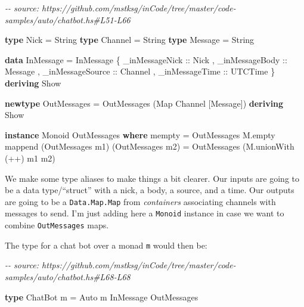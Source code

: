 \documentclass[]{article}
\newenvironment{Shaded}{}{}
\newcommand{\CommentTok}[1]{\textcolor[rgb]{0.38,0.63,0.69}{\textit{#1}}}
\newcommand{\DataTypeTok}[1]{\textcolor[rgb]{0.56,0.13,0.00}{#1}}
\newcommand{\FunctionTok}[1]{\textcolor[rgb]{0.02,0.16,0.49}{#1}}
\newcommand{\KeywordTok}[1]{\textcolor[rgb]{0.00,0.44,0.13}{\textbf{#1}}}
\newcommand{\NormalTok}[1]{#1}
\newcommand{\OperatorTok}[1]{\textcolor[rgb]{0.40,0.40,0.40}{#1}}
\newcommand{\OtherTok}[1]{\textcolor[rgb]{0.00,0.44,0.13}{#1}}
\begin{document}
\begin{Shaded}
\begin{Highlighting}[]
\CommentTok{{-}{-} source: https://github.com/mstksg/inCode/tree/master/code{-}samples/auto/chatbot.hs\#L51{-}L66}

\KeywordTok{type} \DataTypeTok{Nick}    \OtherTok{=} \DataTypeTok{String}
\KeywordTok{type} \DataTypeTok{Channel} \OtherTok{=} \DataTypeTok{String}
\KeywordTok{type} \DataTypeTok{Message} \OtherTok{=} \DataTypeTok{String}

\KeywordTok{data} \DataTypeTok{InMessage} \OtherTok{=} \DataTypeTok{InMessage}\NormalTok{ \{}\OtherTok{ \_inMessageNick   ::} \DataTypeTok{Nick}
\NormalTok{                           ,}\OtherTok{ \_inMessageBody   ::} \DataTypeTok{Message}
\NormalTok{                           ,}\OtherTok{ \_inMessageSource ::} \DataTypeTok{Channel}
\NormalTok{                           ,}\OtherTok{ \_inMessageTime   ::} \DataTypeTok{UTCTime}
\NormalTok{                           \} }\KeywordTok{deriving} \DataTypeTok{Show}

\KeywordTok{newtype} \DataTypeTok{OutMessages} \OtherTok{=} \DataTypeTok{OutMessages}\NormalTok{ (}\DataTypeTok{Map} \DataTypeTok{Channel}\NormalTok{ [}\DataTypeTok{Message}\NormalTok{]) }\KeywordTok{deriving} \DataTypeTok{Show}

\KeywordTok{instance} \DataTypeTok{Monoid} \DataTypeTok{OutMessages} \KeywordTok{where}
    \FunctionTok{mempty}  \OtherTok{=} \DataTypeTok{OutMessages}\NormalTok{ M.empty}
    \FunctionTok{mappend}\NormalTok{ (}\DataTypeTok{OutMessages}\NormalTok{ m1) (}\DataTypeTok{OutMessages}\NormalTok{ m2)}
            \OtherTok{=} \DataTypeTok{OutMessages}\NormalTok{ (M.unionWith (}\OperatorTok{++}\NormalTok{) m1 m2)}
\end{Highlighting}
\end{Shaded}

We make some type aliases to make things a bit clearer. Our inputs are going to
be a data type/``struct'' with a nick, a body, a source, and a time. Our outputs
are going to be a \texttt{Data.Map.Map} from \emph{containers} associating
channels with messages to send. I'm just adding here a \texttt{Monoid} instance
in case we want to combine \texttt{OutMessages} maps.

The type for a chat bot over a monad \texttt{m} would then be:

\begin{Shaded}
\begin{Highlighting}[]
\CommentTok{{-}{-} source: https://github.com/mstksg/inCode/tree/master/code{-}samples/auto/chatbot.hs\#L68{-}L68}

\KeywordTok{type} \DataTypeTok{ChatBot}\NormalTok{ m }\OtherTok{=} \DataTypeTok{Auto}\NormalTok{ m }\DataTypeTok{InMessage} \DataTypeTok{OutMessages}
\end{Highlighting}
\end{Shaded}
\end{document}
